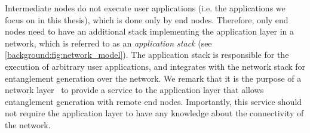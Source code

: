 Intermediate nodes do not execute user applications (i.e. the applications we focus on in this thesis), which is done only by end nodes. 
Therefore, only end nodes need to have an additional stack implementing the application layer in a network, which is referred to as an \emph{application stack} (see \cref{background:fig:network_model}).
The application stack is responsible for the execution of arbitrary user applications, and integrates with the network stack for entanglement generation over the network.
We remark that it is the purpose of a network layer~\cite{dahlberg_2019_egp, kozlowski_2020_qnp} to provide a service to the application layer that allows entanglement generation with remote end nodes.
Importantly, this service should not require the application layer to have any knowledge about the connectivity of the network.

